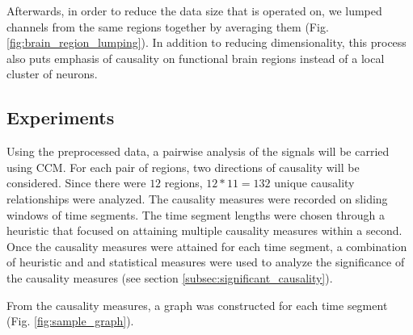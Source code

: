 \documentclass[journal,12pt,onecolumn,draftclsnofoot]{IEEEtran}  %
\begin{document}
Afterwards, in order to reduce the data size that is operated on, we lumped channels from the same regions together by averaging them (Fig. \ref{fig:brain_region_lumping}). In addition to reducing dimensionality, this process also puts emphasis of causality on functional brain regions instead of a local cluster of neurons. 

  

\subsection{Experiments}
Using the preprocessed data, a pairwise analysis of the signals will be carried using CCM. For each pair of regions, two directions of causality will be considered. Since there were $12$ regions, $12*11=132$ unique causality relationships were analyzed. The causality measures were recorded on sliding windows of time segments. The time segment lengths were chosen through a heuristic that focused on attaining multiple causality measures within a second. Once the causality measures were attained for each time segment, a combination of heuristic and and statistical measures were used to analyze the significance of the causality measures (see section \ref{subsec:significant_causality}). 

From the causality measures, a graph was constructed for each time segment (Fig. \ref{fig:sample_graph}). 


\end{document}
